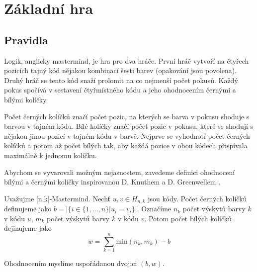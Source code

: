 \chapter{Základní hra}

\section{Pravidla}
Logik, anglicky mastermind, je hra pro dva hráče. První hráč vytvoří na čtyřech pozicích tajný kód nějakou kombinací šesti barev (opakování jsou povolena). Druhý hráč se tento kód snaží prolomit na co nejmenší počet pokusů. Každý pokus spočívá v sestavení čtyřmístného kódu a jeho ohodnocením černými a bílými kolíčky. 

Počet černých kolíčků značí počet pozic, na kterých se barva v pokusu shoduje s barvou v tajném kódu. Bílé kolíčky značí počet pozic v pokusu, které se shodují s nějakou jinou pozicí v tajném kódu v barvě. Nejprve se vyhodnotí počet černých kolíčků a potom až počet bílých tak, aby každá pozice v obou kódech přispívala maximálně k jednomu kolíčku.


Abychom se vyvarovali možným nejasnostem, zavedeme definici ohodnocení bílými a černými kolíčky inspirovanou D. Knuthem \cite{donald_e__knuth_1977} a D. Greenwellem \cite{greenwell}. 



\begin{definice}[ohodnocení]\label{def01:2}
  Uvažujme \textrm{[n,k]-Mastermind}. Nechť $u,v \in H_{n,k}$ jsou kódy. 
  Počet černých kolíčků definujeme jako $b = |\{i \in \{1,\dots, n\}|  u_i = v_i \} |$.
  Označíme $n_k$ počet výskytů barvy $k$ v kódu $u$, $m_k$ počet výskytů barvy $k$ v kódu $v$. 
  Potom počet bílých kolíčků dejinujeme jako 
  \[w = \sum_{k = 1}^n  \textrm{min}(n_k, m_k) - b\]
  
  Ohodnocením myslíme uspořádanou dvojici $(b,w)$.
\end{definice}

